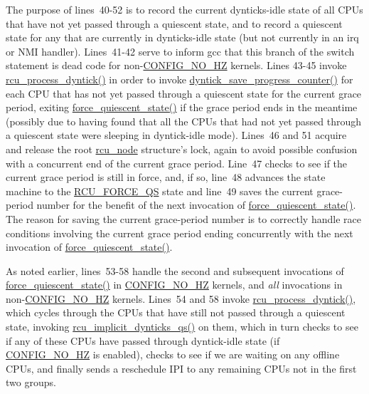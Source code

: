 The purpose of lines~40-52 is to record the current dynticks-idle state
of all CPUs that have not yet passed through a quiescent state, and
to record a quiescent state for any that are currently in dynticks-idle
state (but not currently in an irq or NMI handler).
Lines~41-42 serve to inform gcc that this branch of the switch statement
is dead code for non-\url{CONFIG_NO_HZ} kernels.
Lines 43-45 invoke \url{rcu_process_dyntick()} in order to invoke
\url{dyntick_save_progress_counter()} for each CPU that has not yet
passed through a quiescent state for the current grace period,
exiting \url{force_quiescent_state()} if the grace period ends in
the meantime (possibly due to having found that all the CPUs that
had not yet passed through a quiescent state were sleeping in
dyntick-idle mode).
Lines~46 and 51 acquire and release the root \url{rcu_node} structure's
lock, again to avoid possible confusion with a concurrent end of the
current grace period.
Line~47 checks to see if the current grace period is still in force, and,
if so, line~48 advances the state machine to the \url{RCU_FORCE_QS} state
and line~49 saves the current grace-period number for the benefit of
the next invocation of \url{force_quiescent_state()}.
The reason for saving the current grace-period number is to correctly
handle race conditions involving the current grace period ending
concurrently with the next invocation of \url{force_quiescent_state()}.

As noted earlier, lines~53-58 handle the second and subsequent invocations
of \url{force_quiescent_state()} in \url{CONFIG_NO_HZ} kernels, and \emph{all}
invocations in non-\url{CONFIG_NO_HZ} kernels.
Lines~54 and 58 invoke \url{rcu_process_dyntick()}, which cycles through
the CPUs that have still not passed through a quiescent state, invoking
\url{rcu_implicit_dynticks_qs()} on them, which in turn checks to see
if any of these CPUs have passed through dyntick-idle state (if
\url{CONFIG_NO_HZ} is enabled), checks to see if we are waiting on
any offline CPUs, and finally sends a reschedule IPI to any remaining
CPUs not in the first two groups.

